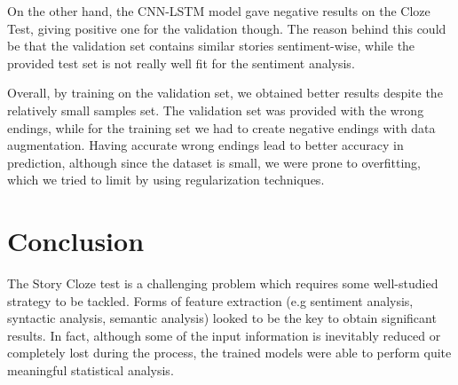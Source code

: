 \documentclass{article}
\begin{document}
On the other hand, the CNN-LSTM model gave negative results on the Cloze Test, giving positive one for the validation though. The reason behind this could be that the validation set contains similar stories sentiment-wise, while the provided test set is not really well fit for the sentiment analysis.

Overall, by training on the validation set, we obtained better results despite the relatively small samples set. The validation set was provided with the wrong endings, while for the training set we had to create negative endings with data augmentation. Having accurate wrong endings lead to better accuracy in prediction, although since the dataset is small, we were prone to overfitting, which we tried to limit by using regularization techniques.

\section{Conclusion}
The Story Cloze test is a challenging problem which requires some well-studied strategy to be tackled. Forms of feature extraction (e.g sentiment analysis, syntactic analysis, semantic analysis) looked to be the key to obtain significant results. In fact, although some of the input information is inevitably reduced or completely lost during the process, the trained models were able to perform quite meaningful statistical analysis.
\end{document}

